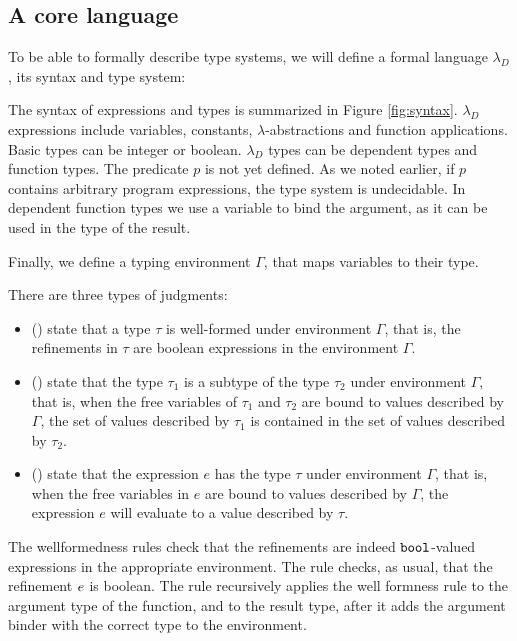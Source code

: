 \subsection{A core language}

To be able to formally describe type systems, we will define a formal 
language $\lambda_D$, its syntax and type system:

The syntax of expressions and types is summarized in Figure \ref{fig:syntax}.
$\lambda_D$ expressions include variables, constants, $\lambda$-abstractions
and function applications. 
Basic types can be integer or boolean.
$\lambda_D$ types can be dependent types and function types.
The predicate $p$ is
not yet defined. As we noted earlier, if $p$ contains arbitrary program 
expressions, the type system is undecidable.
In dependent function types we use a variable to bind the argument, 
as it can be used in the type of the result.

Finally, we define a typing environment $\Gamma$, that maps variables to their type.


There are three types of judgments:
\begin{itemize}
\item{ (\isWellFormed{\Gamma}{\tau})} 
state that a type $\tau$ is well-formed under environment
$\Gamma$, that is, the refinements in $\tau$ are boolean 
expressions in the environment $\Gamma$.

\item{ ()} 
state that the type $\tau_1$ is a subtype of the type
$\tau_2$ under environment $\Gamma$, that is, when the free variables
of $\tau_1$ and $\tau_2$
are bound to values described by $\Gamma$, the set of values described
by $\tau_1$ is contained in the set of values described by $\tau_2$. 


\item{ ()} state that
the expression $e$ has the type $\tau$ under environment $\Gamma$,
that is, when the free variables in $e$ are bound to values described by 
$\Gamma$, the expression $e$ will evaluate to a value described by $\tau$.
\end{itemize}

The wellformedness rules check that the 
refinements are indeed $\texttt{bool}$-valued expressions in the 
appropriate environment.
The rule \wtBase checks, as usual, that the  
refinement $e$ is boolean.
The rule \wtFun recursively applies the well formness rule to
the argument type of the function, and to the result type, 
after it adds the argument binder with the correct type to 
the environment.


